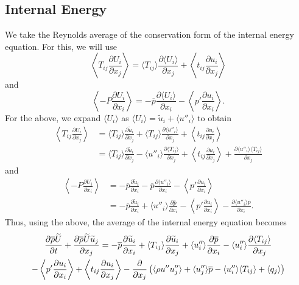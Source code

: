 \documentclass[oneside,a4paper,11pt]{report}
\newcommand{\rhoavg}{\overline{\rho}}
\newcommand{\pavg}{\overline{p}}
\newcommand{\pfluc}{p'}
\newcommand{\uiavg}{\langle U_i \rangle}
\newcommand{\uifluc}{u_i}
\newcommand{\uavgf}{\widetilde{u}}
\newcommand{\Uavgf}{\widetilde{U}}
\newcommand{\uflucf}{u''}
\begin{document}
\subsection{Internal Energy}
We take the Reynolds average of the conservation form of the internal energy equation. For this, we will use
\begin{equation}
    \left < T_{ij} \frac{\partial U_i}{\partial x_j} \right > = \langle T_{ij} \rangle \frac{\partial \uiavg}{\partial x_j} + \left < t_{ij} \frac{\partial \uifluc}{\partial x_j} \right >
\end{equation}
and
\begin{equation}
    \left < -P \frac{\partial U_i}{\partial x_i} \right > = -\pavg \frac{\partial \uiavg}{\partial x_i} - \left < \pfluc \frac{\partial \uifluc}{\partial x_i} \right >.
\end{equation}
For the above, we expand $\uiavg$ as $\uiavg = \uavgf_i + \langle \uflucf_i \rangle$ to obtain 
\begin{align}
    \left < T_{ij} \frac{\partial U_i}{\partial x_j} \right > &= \langle T_{ij} \rangle \frac{\partial \uavgf_i}{\partial x_j} + \langle T_{ij} \rangle \frac{\partial \langle \uflucf_i \rangle}{\partial x_j} + \left < t_{ij} \frac{\partial \uifluc}{\partial x_j} \right > \nonumber \\
    &= \langle T_{ij} \rangle \frac{\partial \uavgf_i}{\partial x_j} - \langle \uflucf_i \rangle \frac{\partial \langle T_{ij} \rangle}{\partial x_j} + \left < t_{ij} \frac{\partial \uifluc}{\partial x_j} \right > + \frac{\partial \langle \uflucf_i \rangle \langle T_{ij} \rangle}{\partial x_j}
\end{align}
and
\begin{align}
    \left < -P \frac{\partial U_i}{\partial x_i} \right > &= -\pavg \frac{\partial \uavgf_i}{\partial x_i} - \pavg \frac{\partial \langle \uflucf_i \rangle}{\partial x_i} - \left < \pfluc \frac{\partial \uifluc}{\partial x_i} \right > \nonumber \\
    &= -\pavg \frac{\partial \uavgf_i}{\partial x_i} + \langle \uflucf_i \rangle \frac{\partial \pavg}{\partial x_i} - \left < \pfluc \frac{\partial \uifluc}{\partial x_i} \right > - \frac{\partial \langle \uflucf_i \rangle \pavg}{\partial x_i}.
\end{align}
Thus, using the above, the average of the internal energy equation becomes
\begin{multline}
    \frac{\partial \rhoavg \Uavgf}{\partial t} + \frac{\partial \rhoavg \Uavgf \uavgf_j}{\partial x_j} = -\pavg \frac{\partial \uavgf_i}{\partial x_i} + \langle T_{ij} \rangle \frac{\partial \uavgf_i}{\partial x_j} +\langle \uflucf_i \rangle \frac{\partial \pavg}{\partial x_i} - \langle \uflucf_i \rangle \frac{\partial \langle T_{ij} \rangle}{\partial x_j} \\
    - \left < \pfluc \frac{\partial \uifluc}{\partial x_i} \right > + \left < t_{ij} \frac{\partial \uifluc}{\partial x_j} \right > - \frac{\partial}{\partial x_j} \left ( \langle \rho u'' \uflucf_j \rangle +  \langle \uflucf_j \rangle \pavg - \langle \uflucf_i \rangle \langle T_{ij} \rangle + \lbra q_j \rbra \right)
\end{multline}
\end{document}
